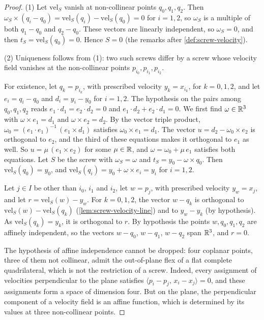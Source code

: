 \begin{proof}
  \leanok
  (1) Let $\mathrm{vel}_S$ vanish at non-collinear points
  $q_0, q_1, q_2$. Then
  $\omega_S \times (q_i - q_0) = \mathrm{vel}_S(q_i) - \mathrm{vel}_S(q_0)
  = 0$ for $i = 1, 2$, so $\omega_S$ is a multiple of both $q_1 - q_0$
  and $q_2 - q_0$. These vectors are linearly independent, so
  $\omega_S = 0$, and then $t_S = \mathrm{vel}_S(q_0) = 0$. Hence
  $S = 0$ (the remarks after \cref{def:screw-velocity}).

  (2) Uniqueness follows from (1): two such screws differ by a screw
  whose velocity field vanishes at the non-collinear points
  $p_{i_0}, p_{i_1}, p_{i_2}$.

  For existence, let $q_k = p_{i_k}$, with prescribed velocity
  $y_k = x_{i_k}$, for $k = 0, 1, 2$, and let
  $e_i = q_i - q_0$ and $d_i = y_i - y_0$ for $i = 1, 2$. The hypothesis
  on the pairs among $q_0, q_1, q_2$ reads $e_1 \cdot d_1 = e_2 \cdot d_2 = 0$ and
  $e_1 \cdot d_2 + e_2 \cdot d_1 = 0$. We first find $\omega \in {\mathbb{R}}^3$
  with $\omega \times e_1 = d_1$ and $\omega \times e_2 = d_2$. By the
  vector triple product,
  $\omega_0 = (e_1 \cdot e_1)^{-1}\, (e_1 \times d_1)$ satisfies
  $\omega_0 \times e_1 = d_1$. The vector $u = d_2 - \omega_0 \times e_2$
  is orthogonal to $e_2$, and the third of these equations makes it
  orthogonal to $e_1$ as well. So $u = \mu\, (e_1 \times e_2)$ for some $\mu \in {\mathbb{R}}$,
  and $\omega = \omega_0 + \mu\, e_1$ satisfies both equations. Let $S$
  be the screw with $\omega_S = \omega$ and
  $t_S = y_0 - \omega \times q_0$. Then $\mathrm{vel}_S(q_0) = y_0$, and
  $\mathrm{vel}_S(q_i) = y_0 + \omega \times e_i = y_i$ for $i = 1, 2$.

  Let $j \in I$ be other than $i_0$, $i_1$ and $i_2$, let $w = p_j$, with
  prescribed velocity $y_w = x_j$, and let
  $r = \mathrm{vel}_S(w) - y_w$. For $k = 0, 1, 2$, the vector
  $w - q_k$ is orthogonal to $\mathrm{vel}_S(w) - \mathrm{vel}_S(q_k)$
  (\cref{lem:screw-velocity-line}) and to $y_w - y_k$ (by hypothesis).
  As $\mathrm{vel}_S(q_k) = y_k$, it is orthogonal to $r$. By hypothesis
  the points $w, q_0, q_1, q_2$ are affinely independent, so the vectors
  $w - q_0$, $w - q_1$, $w - q_2$ span ${\mathbb{R}}^3$, and $r = 0$.

  The hypothesis of affine independence cannot be dropped: four coplanar
  points, three of them not collinear, admit the out-of-plane flex of a
  flat complete quadrilateral, which is not the restriction of a screw.
  Indeed, every assignment of velocities perpendicular to the plane
  satisfies $\langle p_i - p_j,\, x_i - x_j \rangle = 0$, and these
  assignments form a space of dimension four. But on the plane, the
  perpendicular component of a velocity field is an affine function,
  which is determined by its values at three non-collinear points.
\end{proof}

